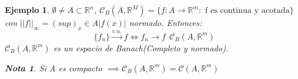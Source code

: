 \documentclass[11pt, a4paper, titlepage]{article}
\newcommand{\R}{\mathbb{R}}
\theoremstyle{theorem-style}
\theoremstyle{definition-style}
\theoremstyle{remark-style}
\newtheorem*{nota}{Nota}
\theoremstyle{example-style}
\newtheorem*{ejemplo}{Ejemplo}
\begin{document}
\begin{ejemplo}
	$\emptyset \ne A \subset \R^n$, $\mathcal{C}_B(A,\R^M) = \{f:A \to \R^m : \text{ f es continua y acotada}\}$ con $||f||_\infty=(sup)_x\in A |f(x)|$ normado. Entonces:
	\[
	\{f_n\}\xrightarrow{c.u.} f \iff f_n \to f \ \ \mathcal{C}_B(A,\R^m)
	\]
$	\mathcal{C}_B(A,\R^m)$ es un espacio de Banach(Completo y normado).

\begin{nota}
	Si A es compacto $\implies \mathcal{C}_B(A,\R^m) = \mathcal{C}(A,\R^m)$
\end{nota}
\end{ejemplo}
\end{document}
